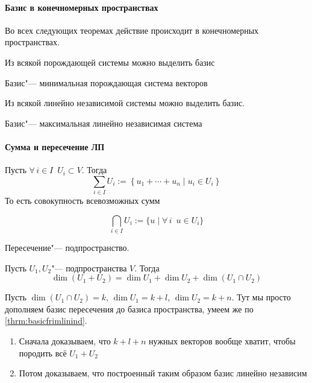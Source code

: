 \documentclass[12pt]{../../notes}
\begin{document}
\paragraph{Базис в конечномерных пространствах}
Во всех следующих теоремах действие происходит в конечномерных пространствах.

\begin{thrm}\label{thrm:basisfromspan}
  Из всякой порождающей системы можно выделить базис
\end{thrm}

\begin{imp}
  Базис"--- минимальная порождающая система векторов
\end{imp}

\begin{thrm}\label{thrm:basicfrimlinind}
  Из всякой линейно независимой системы можно выделить базис.
\end{thrm}
\begin{imp}
  Базис"--- максимальная линейно независимая система
\end{imp}

\paragraph{Сумма и пересечение ЛП}
\begin{defn}\label{defn:linspsum}
  Пусть $\forall\, i \in I \;\: U_i \subset V$. Тогда 
  \[
    \sum_{i\in I} U_i := \left\{ u_{1} + \dotsb + u_{n} \mid u_{i} \in U_i\right\}
  \]
  То есть совокупность всевозможных сумм
\end{defn}
\begin{defn}\label{defn:linspintersec}
  \[
    \bigcap_{i\in I} U_i := \{u \mid \forall\, i \;\: u \in U_i\}
  \]
\end{defn}

\begin{rem*}
  Пересечение"--- подпространство.
\end{rem*}

\begin{thrm}\label{thrm:dimsumlinsp}
  Пусть $U_1, U_2 $"--- подпространства $V$.
  Тогда
  \[
    \dim (U_1+U_2) = \dim U_1 + \dim U_2 + \dim (U_1 \cap U_2)
  \]
\end{thrm}
\begin{ittproof}
  Пусть $\dim(U_1 \cap U_2) = k$, $\dim U_1 = k + l$, $\dim U_2 = k + n$. Тут мы просто дополняем
  базис пересечения до базиса пространства, умеем же по \ref{thrm:basicfrimlinind}.
  \begin{enumerate}
    \item Сначала доказываем, что $k + l + n$ нужных векторов вообще хватит, чтобы породить всё
      $U_1 + U_2$
    \item Потом доказываем, что построенный таким образом базис линейно независим
  \end{enumerate}
\end{ittproof}
\end{document}
